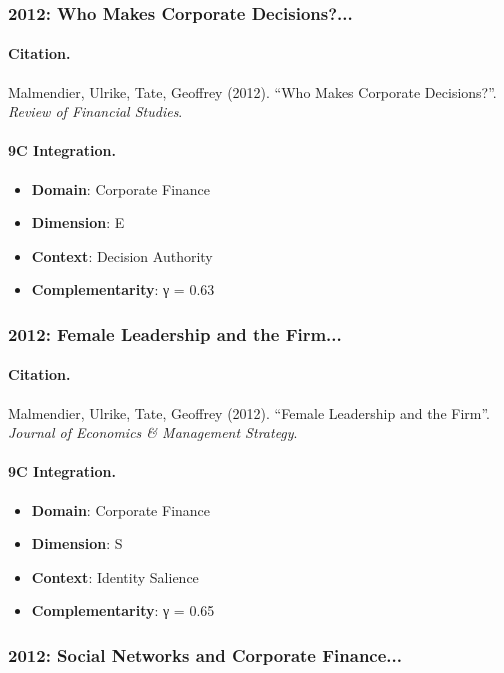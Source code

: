 \subsubsection{2012: Who Makes Corporate Decisions?...}

\paragraph{Citation.}
Malmendier, Ulrike, Tate, Geoffrey (2012). ``Who Makes Corporate Decisions?''. \textit{Review of Financial Studies}.

\paragraph{9C Integration.}
\begin{itemize}[nosep]
  \item \textbf{Domain}: Corporate Finance
  \item \textbf{Dimension}: E
  \item \textbf{Context}: Decision Authority
  \item \textbf{Complementarity}: γ = 0.63
\end{itemize}


\subsubsection{2012: Female Leadership and the Firm...}

\paragraph{Citation.}
Malmendier, Ulrike, Tate, Geoffrey (2012). ``Female Leadership and the Firm''. \textit{Journal of Economics & Management Strategy}.

\paragraph{9C Integration.}
\begin{itemize}[nosep]
  \item \textbf{Domain}: Corporate Finance
  \item \textbf{Dimension}: S
  \item \textbf{Context}: Identity Salience
  \item \textbf{Complementarity}: γ = 0.65
\end{itemize}


\subsubsection{2012: Social Networks and Corporate Finance...}

